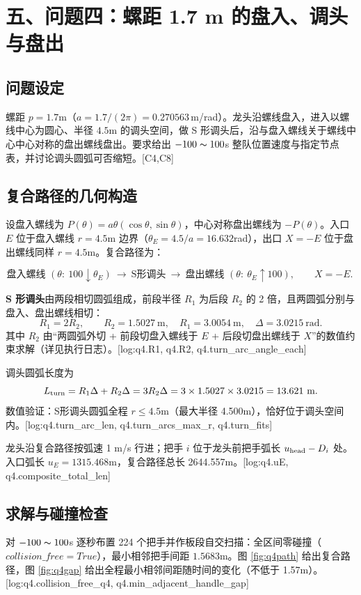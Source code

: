 \section*{五、问题四：螺距 1.7 m 的盘入、调头与盘出}

\subsection{问题设定}
螺距 $p=1.7$m（$a=1.7/(2\pi)=0.270563$\,m/rad）。龙头沿螺线盘入，进入以螺线中心为圆心、半径 $4.5$m 的调头空间，做 S 形调头后，沿与盘入螺线关于螺线中心中心对称的盘出螺线盘出。要求给出 $-100\thicksim100$s 整队位置速度与指定节点表，并讨论调头圆弧可否缩短。[C4,C8]

\subsection{复合路径的几何构造}
设盘入螺线为 $P(\theta)=a\theta(\cos\theta,\sin\theta)$，中心对称盘出螺线为 $-P(\theta)$。入口 $E$ 位于盘入螺线 $r=4.5$m 边界（$\theta_E=4.5/a=16.632$rad），出口 $X=-E$ 位于盘出螺线同样 $r=4.5$m。复合路径为：

\[
\text{盘入螺线 }(\theta:\ 100\downarrow \theta_E)\ \to\ \text{S形调头}\ \to\ \text{盘出螺线 }(\theta:\ \theta_E\uparrow 100),\qquad X=-E.\
\]

\textbf{S 形调头}由两段相切圆弧组成，前段半径 $R_1$ 为后段 $R_2$ 的 2 倍，且两圆弧分别与盘入、盘出螺线相切：
\begin{equation}\label{eq:sarc}
R_1=2R_2,\qquad R_2=1.5027\ \text{m},\quad R_1=3.0054\ \text{m},\quad \Delta=3.0215\ \text{rad}.
\end{equation}
其中 $R_2$ 由“两圆弧外切 + 前段切盘入螺线于 $E$ + 后段切盘出螺线于 $X$”的数值约束求解（详见执行日志）。[log:q4.R1, q4.R2, q4.turn\_arc\_angle\_each]

调头圆弧长度为
\begin{equation}\label{eq:lturn}
L_{\rm turn}=R_1\Delta+R_2\Delta=3R_2\Delta=3\times1.5027\times3.0215=13.621\ \text{m}.
\end{equation}
数值验证：S形调头圆弧全程 $r\le4.5$m（最大半径 4.500m），恰好位于调头空间内。[log:q4.turn\_arc\_len, q4.turn\_arcs\_max\_r, q4.turn\_fits]

龙头沿复合路径按弧速 1 m/s 行进；把手 $i$ 位于龙头前把手弧长 $u_{\rm head}-D_i$ 处。入口弧长 $u_E=1315.468$m，复合路径总长 2644.557m。[log:q4.uE, q4.composite\_total\_len]

\subsection{求解与碰撞检查}
对 $-100\thicksim100$s 逐秒布置 224 个把手并作板段自交扫描：全区间零碰撞（$collision\_free=True$），最小相邻把手间距 $1.5683$m。图 \ref{fig:q4path} 给出复合路径，图 \ref{fig:q4gap} 给出全程最小相邻间距随时间的变化（不低于 1.57m）。[log:q4.collision\_free\_q4, q4.min\_adjacent\_handle\_gap]

